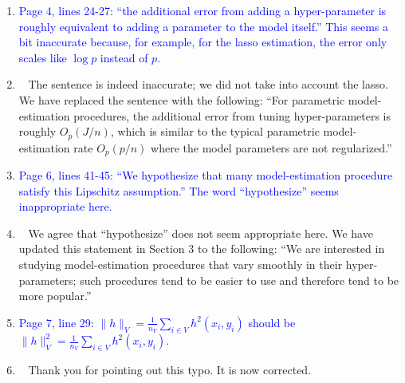 \documentclass[]{article}
\newcommand{\point}[1]{\item \textcolor{blue}{#1}}
\newcommand{\reply}{\item[]\ }
\begin{document}
\begin{enumerate}
{		}

		\point{
			Page 4, lines 24-27: “the additional error from adding a hyper-parameter is roughly equivalent to adding a parameter to the model itself.” This seems a bit inaccurate because, for example, for the lasso estimation, the error only scales like $\log p$ instead of $p$.
		}

		\reply {
			The sentence is indeed inaccurate; we did not take into account the lasso.
			We have replaced the sentence with the following: ``For parametric model-estimation procedures, the additional error from tuning hyper-parameters is roughly $O_p(J/n)$, which is similar to the typical parametric model-estimation rate $O_p(p/n)$ where the model parameters are not regularized.''
		}

		\point{
		Page 6, lines 41-45: “We hypothesize that many model-estimation procedure satisfy this Lipschitz assumption.” The word “hypothesize” seems inappropriate here.
		}

		\reply{
			We agree that ``hypothesize'' does not seem appropriate here.
			We have updated this statement in Section 3 to the following: ``We are interested in studying model-estimation procedures that vary smoothly in their hyper-parameters; such procedures tend to be easier to use and therefore tend to be more popular.''
		}
	
		\point{
			Page 7, line 29: $\|h\|_V = \frac{1}{n_V} \sum_{i \in V} h^2(x_i, y_i)$ should be $\|h\|_V^2 = \frac{1}{n_V} \sum_{i \in V} h^2(x_i, y_i).$
		}
	
		\reply{
			Thank you for pointing out this typo. It is now corrected.
		}
	
		\end{enumerate} 
	
\end{document}

